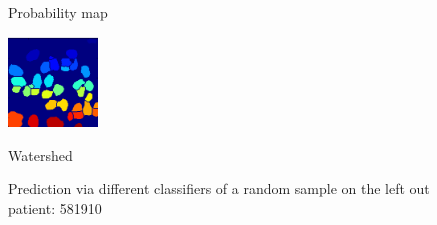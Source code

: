 \documentclass{article}
\begin{document}
\begin{figure}[htb]
\begin{minipage}[b]{.32\linewidth}
  \centerline{Probability map}\medskip
\end{minipage}
\hfill
\begin{minipage}[b]{.32\linewidth}
  \centering
  \centerline{\includegraphics[height=2.4cm]{FCN_WS}}
  \centerline{Watershed}\medskip
\end{minipage}


%
\caption{Prediction via different classifiers of a random sample on the left out patient: 581910}
\label{fig:prediction}
%
\end{figure}

\end{document}
